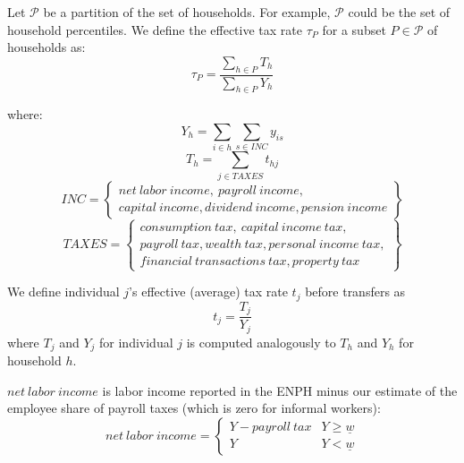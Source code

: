 \documentclass[12pt]{article}
\begin{document}
Let $\mathcal{P}$ be a partition of the set of households.
For example, $\mathcal{P}$ could be the set of household percentiles.
We define the effective tax rate $\tau_P$
for a subset $P\in\mathcal{P}$ of households as:
\begin{equation}
  \tau_P = \frac{\sum_{h\in P}T_{h}} {\sum_{h\in P}Y_h}
\end{equation}
\iffalse [[JEFF: Verify: is that even what we do?
    I (Jeff) thought we compute an average of ratios,
    not a ratio of averages.]]
\fi
where:
\begin{equation}
Y_h = \sum_{i\in h}\sum_{s\in INC}y_{is}
\end{equation}
\begin{equation}
T_h = \sum_{j\in TAXES}t_{hj}
\end{equation}
\begin{equation}
  INC = \left\{ \begin{array}{cc}
    net\ labor\ income,\ payroll\ income, \\
    capital\ income, dividend\ income, pension\ income
  \end{array} \right\}
\end{equation}
\begin{equation}
  TAXES = \left\{ \begin{array}{cc}
    consumption\ tax,\ capital\ income\ tax,          \\
    payroll\ tax, wealth\ tax, personal\ income\ tax, \\
    financial\  transactions\ tax, property\ tax
  \end{array} \right\}
\end{equation}

\iffalse
    [[ PITFALL (DONE):
        It's unfortunate to have to specify ``tax'' and ``income''
        after each of the terms in the preceding two equations,
        but otherwise they are confusible --
        e.g. ``personal could be personal income or a tax on it;
        ``labor'' and ``payroll''
        could be income or taxes on that income; etc. ]]
\fi

We define
individual $j$'s effective (average) tax rate $t_j$ before transfers as
\begin{equation}
  t_j=\frac
  {T_j}
  {Y_j}
\end{equation}
where $T_j$ and $Y_j$ for individual $j$ is computed analogously to
$T_h$ and $Y_h$ for household $h$.

$net\ labor\ income$ is labor income reported in the ENPH
minus our estimate of the employee share of payroll taxes
(which is zero for informal workers):
\begin{equation}
net\ labor\ income =
  \begin{cases}
	Y - payroll\ tax & Y \geq \underline{w} \\
	Y &  Y < \underline{w}
  \end{cases}
\end{equation}
\end{document}
